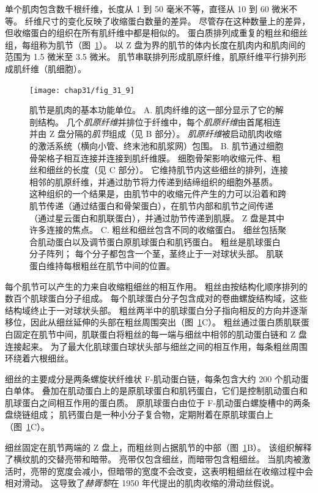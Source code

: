 单个肌肉包含数千根纤维，长度从 1 到 50 毫米不等，直径从 10 到 60 微米不等。
纤维尺寸的变化反映了收缩蛋白数量的差异。
尽管存在这种数量上的差异，但收缩蛋白的组织在所有肌纤维中都是相似的。 
蛋白质排列成重复的粗丝和细丝组，每组称为肌节（图~\ref{fig:31_9}）。
以 Z 盘为界的肌节的体内长度在肌肉内和肌肉间的范围为 1.5 微米至 3.5 微米。
肌节串联排列形成肌原纤维，肌原纤维平行排列形成肌纤维（肌细胞）。



\begin{figure}[htbp]
	\centering
	\texttt{[image: chap31/fig\_31\_9]}
	\caption{肌节是肌肉的基本功能单位\cite{bloom1952textbook}。
	A. 肌肉纤维的这一部分显示了它的解剖结构。
	几个\textit{肌原纤维}并排位于纤维中，每个\textit{肌原纤维}由首尾相连并由 Z 盘分隔的\textit{肌节}组成（见 B 部分）。
	\textit{肌原纤维}被启动肌肉收缩的激活系统（横向小管、终末池和肌浆网）包围。
	B. 肌节通过细胞骨架格子相互连接并连接到肌纤维膜。
	细胞骨架影响收缩元件、粗丝和细丝的长度（见 C 部分）。
	它维持肌节内这些细丝的排列，连接相邻的肌原纤维，并通过肋节将力传递到结缔组织的细胞外基质。
	这种组织的一个结果是，由肌节中的收缩元件产生的力可以沿着和跨肌节传递（通过结蛋白和骨架蛋白），在肌节内部和肌节之间传递（通过星云蛋白和肌联蛋白），并通过肋节传递到肌膜。
	Z 盘是其中许多连接的焦点。
	C. 粗丝和细丝包含不同的收缩蛋白。
	细丝包括聚合肌动蛋白以及调节蛋白原肌球蛋白和肌钙蛋白。
	粗丝是肌球蛋白分子阵列；
	每个分子都包含一个茎，茎终止于一对球状头部。
	肌联蛋白维持每根粗丝在肌节中间的位置。}
	\label{fig:31_9}
\end{figure}


每个肌节可以产生的力来自收缩粗细丝的相互作用。
粗丝由按结构化顺序排列的数百个肌球蛋白分子组成。
每个肌球蛋白分子包含成对的卷曲螺旋结构域，这些结构域终止于一对球状头部。
粗丝两半中的肌球蛋白分子指向相反的方向并逐渐移位，因此从细丝延伸的头部在粗丝周围突出（图~\ref{fig:31_9}C）。
粗丝通过蛋白质肌联蛋白固定在肌节中间，肌联蛋白将粗丝的每一端与细丝中相邻的肌动蛋白链和 Z 盘连接起来。
为了最大化肌球蛋白球状头部与细丝之间的相互作用，每条粗丝周围环绕着六根细丝。


细丝的主要成分是两条螺旋状纤维状 F-肌动蛋白链，每条包含大约 200 个肌动蛋白单体。
叠加在肌动蛋白上的是原肌球蛋白和肌钙蛋白，它们是控制肌动蛋白和肌球蛋白之间相互作用的蛋白质。
原肌球蛋白由位于 F-肌动蛋白螺旋槽中的两条盘绕链组成；
肌钙蛋白是一种小分子复合物，定期附着在原肌球蛋白上（图~\ref{fig:31_9}C）。


细丝固定在肌节两端的 Z 盘上，而粗丝则占据肌节的中部（图~\ref{fig:31_9}B）。
该组织解释了横纹肌的交替亮带和暗带。
亮带仅包含细丝，而暗带包含粗细丝。
当肌肉被激活时，亮带的宽度会减小，但暗带的宽度不会改变，这表明粗细丝在收缩过程中会相对滑动。
这导致了\textit{赫胥黎}在 1950 年代提出的肌肉收缩的滑动丝假说。


